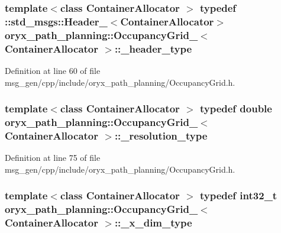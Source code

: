 \subsubsection[{\-\_\-header\-\_\-type}]{\setlength{\rightskip}{0pt plus 5cm}template$<$class Container\-Allocator $>$ typedef \-::std\-\_\-msgs\-::\-Header\-\_\-$<$\-Container\-Allocator$>$ {\bf oryx\-\_\-path\-\_\-planning\-::\-Occupancy\-Grid\-\_\-}$<$ \-Container\-Allocator $>$\-::{\bf \-\_\-header\-\_\-type}}\label{structoryx__path__planning_1_1OccupancyGrid___acfabc324ccc4a37195a708a49a2ff32e}


\-Definition at line 60 of file msg\-\_\-gen/cpp/include/oryx\-\_\-path\-\_\-planning/\-Occupancy\-Grid.\-h.

\subsubsection[{\-\_\-resolution\-\_\-type}]{\setlength{\rightskip}{0pt plus 5cm}template$<$class Container\-Allocator $>$ typedef double {\bf oryx\-\_\-path\-\_\-planning\-::\-Occupancy\-Grid\-\_\-}$<$ \-Container\-Allocator $>$\-::{\bf \-\_\-resolution\-\_\-type}}\label{structoryx__path__planning_1_1OccupancyGrid___a17067d308770846d937a079c112643ef}


\-Definition at line 75 of file msg\-\_\-gen/cpp/include/oryx\-\_\-path\-\_\-planning/\-Occupancy\-Grid.\-h.

\subsubsection[{\-\_\-x\-\_\-dim\-\_\-type}]{\setlength{\rightskip}{0pt plus 5cm}template$<$class Container\-Allocator $>$ typedef int32\-\_\-t {\bf oryx\-\_\-path\-\_\-planning\-::\-Occupancy\-Grid\-\_\-}$<$ \-Container\-Allocator $>$\-::{\bf \-\_\-x\-\_\-dim\-\_\-type}}\label{structoryx__path__planning_1_1OccupancyGrid___a29bbb02734f9b34f1efd0e217675db97}


